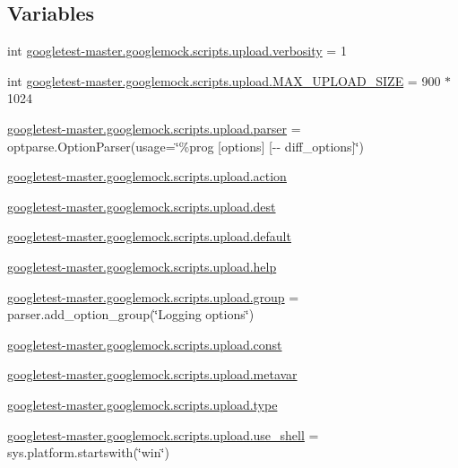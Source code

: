 \subsection*{Variables}
\begin{DoxyCompactItemize}
\item 
int \mbox{\hyperlink{namespacegoogletest-master_1_1googlemock_1_1scripts_1_1upload_a450883b5f5a2d11edb65f8882a11b995}{googletest-\/master.\+googlemock.\+scripts.\+upload.\+verbosity}} = 1
\item 
int \mbox{\hyperlink{namespacegoogletest-master_1_1googlemock_1_1scripts_1_1upload_a5b5b22790c63b81bee055a5f41d4715c}{googletest-\/master.\+googlemock.\+scripts.\+upload.\+M\+A\+X\+\_\+\+U\+P\+L\+O\+A\+D\+\_\+\+S\+I\+ZE}} = 900 $\ast$ 1024
\item 
\mbox{\hyperlink{namespacegoogletest-master_1_1googlemock_1_1scripts_1_1upload_a1d8512763b61ca51229cf811a84c8328}{googletest-\/master.\+googlemock.\+scripts.\+upload.\+parser}} = optparse.\+Option\+Parser(usage=\char`\"{}\%prog \mbox{[}options\mbox{]} \mbox{[}-\/-\/ diff\+\_\+options\mbox{]}\char`\"{})
\item 
\mbox{\hyperlink{namespacegoogletest-master_1_1googlemock_1_1scripts_1_1upload_ae352e8b9e52a3e6d6113e588bb8e6644}{googletest-\/master.\+googlemock.\+scripts.\+upload.\+action}}
\item 
\mbox{\hyperlink{namespacegoogletest-master_1_1googlemock_1_1scripts_1_1upload_aa2ffc66370965e33e10cf43a7fb6ffdc}{googletest-\/master.\+googlemock.\+scripts.\+upload.\+dest}}
\item 
\mbox{\hyperlink{namespacegoogletest-master_1_1googlemock_1_1scripts_1_1upload_aee69061f3d2629e2a0a3b8a87c40d9ed}{googletest-\/master.\+googlemock.\+scripts.\+upload.\+default}}
\item 
\mbox{\hyperlink{namespacegoogletest-master_1_1googlemock_1_1scripts_1_1upload_a73d48d189f9518c260d4344b5489e3fc}{googletest-\/master.\+googlemock.\+scripts.\+upload.\+help}}
\item 
\mbox{\hyperlink{namespacegoogletest-master_1_1googlemock_1_1scripts_1_1upload_ab3d587b2dffeed06bb92df813e1f382d}{googletest-\/master.\+googlemock.\+scripts.\+upload.\+group}} = parser.\+add\+\_\+option\+\_\+group(\char`\"{}Logging options\char`\"{})
\item 
\mbox{\hyperlink{namespacegoogletest-master_1_1googlemock_1_1scripts_1_1upload_a949e40a39895effaf1d448f44987aa69}{googletest-\/master.\+googlemock.\+scripts.\+upload.\+const}}
\item 
\mbox{\hyperlink{namespacegoogletest-master_1_1googlemock_1_1scripts_1_1upload_ad1cb47051b62c4a6c709d7548b185a64}{googletest-\/master.\+googlemock.\+scripts.\+upload.\+metavar}}
\item 
\mbox{\hyperlink{namespacegoogletest-master_1_1googlemock_1_1scripts_1_1upload_a43329293fdfc5c98e42a7239bb9a14c8}{googletest-\/master.\+googlemock.\+scripts.\+upload.\+type}}
\item 
\mbox{\hyperlink{namespacegoogletest-master_1_1googlemock_1_1scripts_1_1upload_a7b94f5547ef6c594813dc3e2b3558439}{googletest-\/master.\+googlemock.\+scripts.\+upload.\+use\+\_\+shell}} = sys.\+platform.\+startswith(\char`\"{}win\char`\"{})
\end{DoxyCompactItemize}
